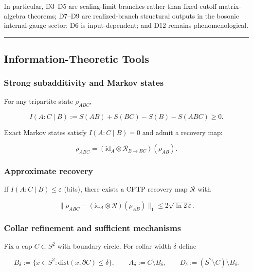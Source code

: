 \endgroup

In particular, D3--D5 are scaling-limit branches rather than fixed-cutoff matrix-algebra theorems; D7--D9 are realized-branch structural outputs in the bosonic internal-gauge sector; D6 is input-dependent; and D12 remains phenomenological.

\begin{center}\rule{0.5\linewidth}{0.5pt}\end{center}
\subsection{Information-Theoretic Tools}\label{2-information-theoretic-tools}

\subsubsection{Strong subadditivity and Markov states}\label{21-strong-subadditivity-and-markov-states}

For any tripartite state \(\rho_{ABC}\),

\[
I(A:C \mid B) := S(AB) + S(BC) - S(B) - S(ABC) \ge 0.
\]

Exact Markov states satisfy \(I(A:C \mid B) = 0\) and admit a recovery map:

\[
\rho_{ABC} = (\mathrm{id}_A \otimes \mathcal R_{B\to BC})(\rho_{AB}).
\]

\subsubsection{Approximate recovery}\label{22-approximate-recovery}

If \(I(A:C \mid B) \le \varepsilon\) (bits), there exists a CPTP recovery map \(\mathcal{R}\) with

\[
\| \rho_{ABC} - (\mathrm{id}_A \otimes \mathcal R)(\rho_{AB}) \|_1
\le 2 \sqrt{\ln 2\, \varepsilon}.
\]

\subsubsection{Collar refinement and sufficient mechanisms}\label{23-collar-refinement-and-sufficient-mechanisms}

Fix a cap \(C \subset S^2\) with boundary circle. For collar width \(\delta\) define

\[
B_\delta := \{x \in S^2 : \mathrm{dist}(x,\partial C) \le \delta\},
\qquad
A_\delta := C \setminus B_\delta,
\qquad
D_\delta := (S^2 \setminus C) \setminus B_\delta.
\]

